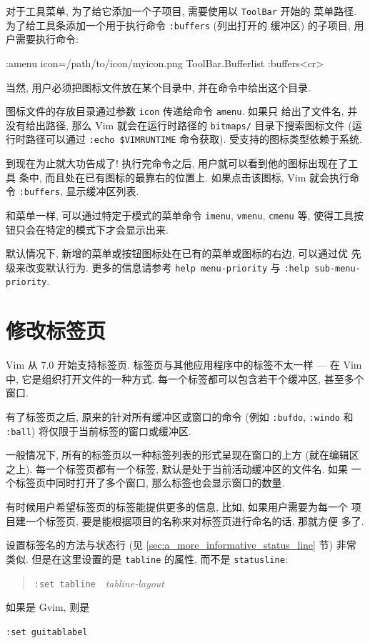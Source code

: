 对于工具菜单, 为了给它添加一个子项目, 需要使用以 \texttt{ToolBar} 开始的
菜单路径. 为了给工具条添加一个用于执行命令 \texttt{:buffers} (列出打开的
缓冲区) 的子项目, 用户需要执行命令:
\begin{vimcmd}
:amenu icon=/path/to/icon/myicon.png ToolBar.Bufferlist :buffers<cr>
\end{vimcmd}
当然, 用户必须把图标文件放在某个目录中, 并在命令中给出这个目录.

图标文件的存放目录通过参数 \texttt{icon} 传递给命令 \texttt{amenu}. 如果只
给出了文件名, 并没有给出路径, 那么 Vim 就会在运行时路径的 \texttt{bitmaps/}
目录下搜索图标文件 (运行时路径可以通过 \texttt{:echo \$VIMRUNTIME}
命令获取). 受支持的图标类型依赖于系统.

到现在为止就大功告成了! 执行完命令之后, 用户就可以看到他的图标出现在了工具
条中, 而且处在已有图标的最靠右的位置上. 如果点击该图标, Vim 就会执行命令
\texttt{:buffers}, 显示缓冲区列表.

和菜单一样, 可以通过特定于模式的菜单命令 \texttt{imenu}, \texttt{vmenu},
\texttt{cmenu} 等, 使得工具按钮只会在特定的模式下才会显示出来.

\begin{warning}
默认情况下, 新增的菜单或按钮图标处在已有的菜单或图标的右边, 可以通过优
先级来改变默认行为. 更多的信息请参考 \texttt{help menu-priority} 与 
\texttt{:help sub-menu-priority}.
\end{warning}

\section{修改标签页}
\label{sec:modifying_tabs}
Vim 从 7.0 开始支持标签页. 标签页与其他应用程序中的标签不太一样 --- 在
Vim 中, 它是组织打开文件的一种方式. 每一个标签都可以包含若干个缓冲区,
甚至多个窗口.

有了标签页之后, 原来的针对所有缓冲区或窗口的命令 (例如 \texttt{:bufdo},
\texttt{:windo} 和 \texttt{:ball}) 将仅限于当前标签的窗口或缓冲区.

一般情况下, 所有的标签页以一种标签列表的形式呈现在窗口的上方 (就在编辑区
之上). 每一个标签页都有一个标签, 默认是处于当前活动缓冲区的文件名. 如果 
一个标签页中同时打开了多个窗口, 那么标签也会显示窗口的数量.
\begin{center}
\end{center}
有时候用户希望标签页的标签能提供更多的信息, 比如, 如果用户需要为每一个
项目建一个标签页, 要是能根据项目的名称来对标签页进行命名的话, 那就方便
多了.
\begin{center}
\end{center}
设置标签名的方法与状态行 (见 \ref{sec:a_more_informative_status_line} 节)
非常类似. 但是在这里设置的是 \texttt{tabline} 的属性, 而不是
\texttt{statusline}:
\begin{quotation}
    \texttt{:set tabline}\ \ \textit{tabline-layout}
\end{quotation}
\begin{center}
\end{center}
如果是 Gvim, 则是
\begin{vimcmd}
\texttt{:set guitablabel}
\end{vimcmd}

